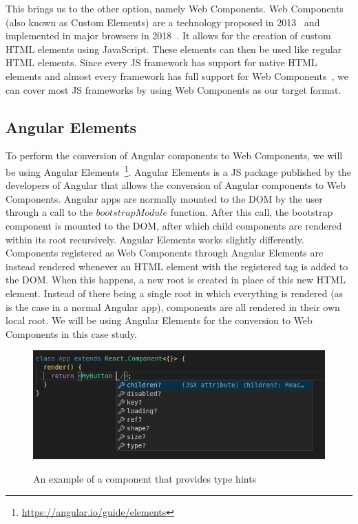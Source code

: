 This brings us to the other option, namely Web Components. Web Components (also known as Custom Elements) are a technology proposed in 2013~\cite{customelements-initial} and implemented in major browsers in 2018~\cite{webcomponents-support}. It allows for the creation of custom HTML elements using JavaScript. These elements can then be used like regular HTML elements. Since every JS framework has support for native HTML elements and almost every framework has full support for Web Components~\cite{custom-elements-everyhwere}, we can cover most JS frameworks by using Web Components as our target format.

\subsection{Angular Elements}\label{sec:bg:angularelements}
To perform the conversion of Angular components to Web Components, we will be using Angular Elements~\footnote{\url{https://angular.io/guide/elements}}. Angular Elements is a JS package published by the developers of Angular that allows the conversion of Angular components to Web Components. Angular apps are normally mounted to the DOM by the user through a call to the \(bootstrapModule\) function. After this call, the bootstrap component is mounted to the DOM, after which child components are rendered within its root recursively. Angular Elements works slightly differently. Components registered as Web Components through Angular Elements are instead rendered whenever an HTML element with the registered tag is added to the DOM\@. When this happens, a new root is created in place of this new HTML element. Instead of there being a single root in which everything is rendered (as is the case in a normal Angular app), components are all rendered in their own local root. We will be using Angular Elements for the conversion to Web Components in this case study.

\begin{figure}[h]
	\caption{An example of a component that provides type hints}
	\includegraphics[width=\columnwidth]{figures/background/hinting.png}
	\label{fig:bg:hinting}
	\centering
\end{figure}

